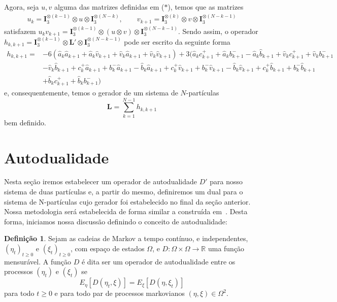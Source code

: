 \documentclass[twoside,openright,titlepage,numbers=noenddot,headinclude,  lineheaders footinclude=true,cleardoublepage=empty,
                                BCOR=5mm,paper=a4,fontsize=12pt ]{scrbook}
\theoremstyle{definition}
\newtheorem{definicao}{Definição}[chapter]
\begin{document}
Agora, seja $u, v$ alguma das matrizes definidas em ($\ast$), temos %
que as matrizes 
\begin{align*}
u_k = \bm{I}_3^{\otimes (k-1)} \otimes u \otimes \bm{I}_3^{ \otimes (N-k) }, \qquad
v_{k+1} = \bm{I}_3^{\otimes (k)} \otimes v \otimes \bm{I}_3^{ \otimes (N-k-1) }
\end{align*}
satisfazem $u_k v_{k+1}=
\bm{I}_3^{\otimes (k-1)} \otimes (u \otimes v) \otimes \bm{I}_3^{ \otimes (N-k-1) }$.
Sendo assim, o operador
$h_{k, k+1} = \bm{I}_3^{\otimes (k-1)} \otimes \bm{L}' \otimes \bm{I}_3^{ \otimes (N-k-1) }$ pode 
ser escrito da seguinte forma
\begin{align*} 
h_{k, k+1} =& -6 ( \widehat{a}_k \widehat{a}_{k+1} + \widehat{a}_k \widehat{v}_{k+1} + \widehat{v}_k \widehat{a}_{k+1} + 
		\widehat{v}_k \widehat{v}_{k+1}) 
     +3 ( \widehat{a}_k c^+_{k+1} + \widehat{a}_k b^-_{k+1} - \widehat{a}_k \widehat{b}_{k+1}
     + \widehat{v}_k c^+_{k+1} + \widehat{v}_k b^-_{k+1} \\
	 & - \widehat{v}_k \widehat{b}_{k+1} 
   + c^+_k \widehat{a}_{k+1} + b^-_k \widehat{a}_{k+1} - \widehat{b}_k \widehat{a}_{k+1} 
   + c^+_k \widehat{v}_{k+1} + b^-_k \widehat{v}_{k+1} - \widehat{b}_k \widehat{v}_{k+1}
   + c^+_k \widehat{b}_{k+1} + b^-_k \widehat{b}_{k+1}\\
   & + \widehat{b}_k c^+_{k+1} + \widehat{b}_k b^-_{k+1})
\end{align*}
e, consequentemente, temos o gerador de um sistema de $N$-partículas
\[
\bm{L} = \sum_{k = 1}^{N-1} h_{k, k+1}
\]
bem definido.

\section{Autodualidade}
Nesta seção iremos estabelecer um operador de autodualidade $D'$ para nosso sistema de duas
partículas e, a partir do mesmo, definiremos um dual para o sistema de N-partículas
cujo gerador foi estabelecido no final da seção anterior. 
Nossa metodologia será estabelecida de forma similar a construída em~\cite{daniela}.
Desta forma, iniciamos nossa discussão definindo o conceito de autodualidade:
\begin{definicao}
Sejam as cadeias de Markov a tempo contínuo, e independentes, $(\eta_t)_{t \geq 0}$ e 
$(\xi_t)_{t \geq 0}$, com espaço de estados $\Omega$, e $D: \Omega \times \Omega \rightarrow \mathbb{R}$
uma função mensurável. A função $D$ é dita ser um operador de autodualidade entre os processos
$(\eta_t)$ e $(\xi_t)$ se
\[
E_{\eta}[ D(\eta_t, \xi) ] = E_{\xi}[ D(\eta, \xi_t) ]
\]
para todo $t \geq 0$ e para todo par de processos markovianos $(\eta, \xi) \in \Omega^2$.
\end{definicao}
\end{document}
